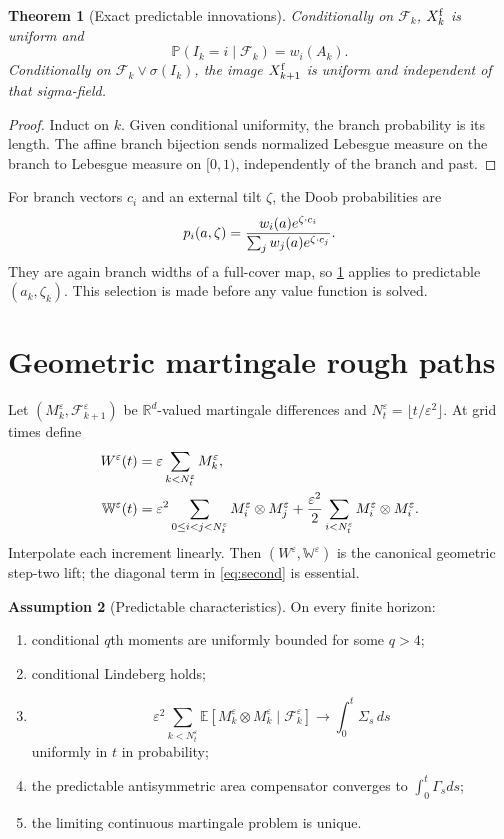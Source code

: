 \documentclass[11pt,reqno]{amsart}
\newtheorem{theorem}{Theorem}[section]
\theoremstyle{definition}
\newtheorem{assumption}[theorem]{Assumption}
\theoremstyle{remark}
\newcommand{\E}{\mathbb E}
\newcommand{\F}{\mathcal F}
\newcommand{\Pp}{\mathbb P}
\newcommand{\R}{\mathbb R}
\begin{document}
\begin{theorem}[Exact predictable innovations]\label{thm:innovations}
Conditionally on $\F_k$, $X_k^{\rm f}$ is uniform and
\[
 \Pp(I_k=i\mid\F_k)=w_i(A_k).
\]
Conditionally on $\F_k\vee\sigma(I_k)$, the image
$X_{k+1}^{\rm f}$ is uniform and independent of that sigma-field.
\end{theorem}

\begin{proof}
Induct on $k$.  Given conditional uniformity, the branch probability is its
length.  The affine branch bijection sends normalized Lebesgue measure on the
branch to Lebesgue measure on $[0,1)$, independently of the branch and past.
\end{proof}

For branch vectors $c_i$ and an external tilt $\zeta$, the Doob probabilities
are
\[
 p_i(a,\zeta)=
 {w_i(a)e^{\zeta\cdot c_i}\over
  \sum_jw_j(a)e^{\zeta\cdot c_j}}.
\]
They are again branch widths of a full-cover map, so
\cref{thm:innovations} applies to predictable $(a_k,\zeta_k)$.  This
selection is made before any value function is solved.

\section{Geometric martingale rough paths}\label{sec:rough}
Let $(M_k^\varepsilon,\F_{k+1}^\varepsilon)$ be $\R^d$-valued martingale
differences and $N_t^\varepsilon=\lfloor t/\varepsilon^2\rfloor$.  At grid
times define
\begin{align}
 W^\varepsilon(t)&=\varepsilon
 \sum_{k<N_t^\varepsilon}M_k^\varepsilon,\label{eq:first}\\
 \mathbb W^\varepsilon(t)&=\varepsilon^2
 \sum_{0\le i<j<N_t^\varepsilon}
 M_i^\varepsilon\otimes M_j^\varepsilon
 +{\varepsilon^2\over2}
 \sum_{i<N_t^\varepsilon}M_i^\varepsilon\otimes M_i^\varepsilon.
 \label{eq:second}
\end{align}
Interpolate each increment linearly.  Then
$(W^\varepsilon,\mathbb W^\varepsilon)$ is the canonical geometric step-two
lift; the diagonal term in \eqref{eq:second} is essential.

\begin{assumption}[Predictable characteristics]\label{ass:chars}
On every finite horizon:
\begin{enumerate}[label=(\roman*)]
\item conditional $q$th moments are uniformly bounded for some $q>4$;
\item conditional Lindeberg holds;
\item
\[
 \varepsilon^2\sum_{k<N_t^\varepsilon}
 \E[M_k^\varepsilon\otimes M_k^\varepsilon\mid\F_k^\varepsilon]
 \longrightarrow\int_0^t\Sigma_s\,ds
\]
uniformly in $t$ in probability;
\item the predictable antisymmetric area compensator converges to
$\int_0^t\Gamma_sds$;
\item the limiting continuous martingale problem is unique.
\end{enumerate}
\end{assumption}
\end{document}
